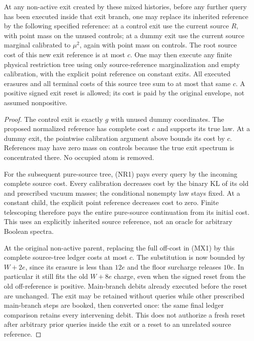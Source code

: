 \begin{proposition}
At any non-active exit created by these mixed histories, before
any further query has been executed inside that exit branch,
one may replace its inherited reference by the following specified
reference: at a control exit use the current source $R$, with point
mass on the unused controls; at a dummy exit use the current source
marginal calibrated to $\mu^2$, again with point mass on controls.
The root source cost of this new exit reference is at most $c$.
One may then execute any finite physical restriction tree using
only source-reference marginalization and empty calibration, with
the explicit point reference on constant exits. All executed
erasures and all terminal costs of this source tree sum to at most
that same $c$. A positive signed exit reset is allowed; its cost
is paid by the original envelope, not assumed nonpositive.
\end{proposition}
\begin{proof}
The control exit is exactly $g$ with unused dummy coordinates.
The proposed normalized reference has complete cost $c$ and
supports its true law. At a dummy exit, the pointwise calibration
argument above bounds its cost by $c$. References may have zero
mass on controls because the true exit spectrum is concentrated
there. No occupied atom is removed.

For the subsequent pure-source tree, (NR1) pays every query by
the incoming complete source cost. Every calibration decreases
cost by the binary KL of its old and prescribed vacuum masses;
the conditional nonempty law stays fixed. At a constant child,
the explicit point reference decreases cost to zero. Finite
telescoping therefore pays the entire pure-source continuation
from its initial cost. This uses an explicitly inherited source
reference, not an oracle for arbitrary Boolean spectra.

At the original non-active parent, replacing the full off-cost
in (MX1) by this complete source-tree ledger costs at most $c$.
The substitution is now bounded by $W+2e$, since its erasure
is less than $12e$ and the floor surcharge releases $10e$.
In particular it still fits the old $W+8e$ charge, even when the
signed reset from the old off-reference is positive. Main-branch
debits already executed before the reset are unchanged.
The exit may be retained without queries while other prescribed
main-branch steps are booked, then converted once: the same final
ledger comparison retains every intervening debit. This does not
authorize a fresh reset after arbitrary prior queries inside the
exit or a reset to an unrelated source reference.
\end{proof}

